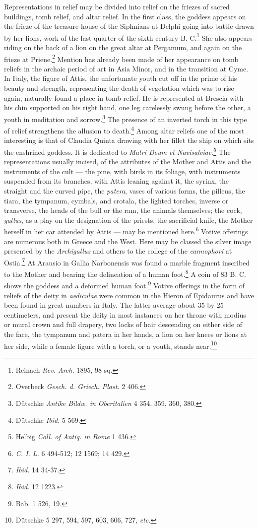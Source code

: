 \documentclass[a4paper, 11pt, oneside, polutonikogreek, english]{article}
\begin{document}
Representations in relief may be divided into relief on the friezes of sacred buildings, tomb relief, and altar relief. In the first class, the goddess appears on the frieze of the treasure-house of the Siphnians at Delphi going into battle drawn by her lions, work of the last quarter of the sixth century B. C.\footnote{Reinach \emph{Rev. Arch.} 1895, 98 sq.} She also appears riding on the back of a lion on the great altar at Pergamum, and again on the frieze at Priene.\footnote{Overbeck \emph{Gesch. d. Griech. Plast.} 2 406.} Mention has already been made of her appearance on tomb reliefs in the archaic period of art in Asia Minor, and in the transition at Cyme. In Italy, the figure of Attis, the unfortunate youth cut off in the prime of his beauty and strength, representing the death of vegetation which was to rise again, naturally found a place in tomb relief. He is represented at Brescia with his chin supported on his right hand, one leg carelessly swung before the other, a youth in meditation and sorrow.\footnote{Dütschke \emph{Antike Bildw. in Oberitalien} 4 354, 359, 360, 380.} The presence of an inverted torch in this type of relief strengthens the allusion to death.\footnote{Dütschke \emph{Ibid.} 5 569.} Among altar reliefs one of the most interesting is that of Claudia Quinta drawing with her fillet the ship on which sits the enshrined goddess. It is dedicated to \emph{Matri Deum et Navisalviae}.\footnote{Helbig \emph{Coll. of Antiq. in Rome} 1 436.} The representations usually incised, of the attributes of the Mother and Attis and the instruments of the cult --- the pine, with birds in its foliage, with instruments suspended from its branches, with Attis leaning against it, the syrinx, the straight and the curved pipe, the \emph{patera}, vases of various forms, the pilleus, the tiara, the tympanum, cymbals, and crotala, the lighted torches, inverse or transverse, the heads of the bull or the ram, the animals themselves; the cock, \emph{gallus}, as a play on the designation of the priests, the sacrificial knife, the Mother herself in her car attended by Attis --- may be mentioned here.\footnote{\emph{C. I. L.} 6 494-512; 12 1569; 14 429.} Votive offerings are numerous both in Greece and the West. Here may be classed the silver image presented by the \emph{Archigallus} and others to the college of the \emph{cannophori} at Ostia.\footnote{\emph{Ibid.} 14 34-37.} At Arausio in Gallia Narbonensis was found a marble fragment inscribed to the Mother and bearing the delineation of a human foot.\footnote{\emph{Ibid.} 12 1223.} A coin of 83 B. C. shows the goddess and a deformed human foot.\footnote{Bab. 1 526, 19.} Votive offerings in the form of reliefs of the deity in \emph{aediculae} were common in the Hieron of Epidaurus and have been found in great numbers in Italy. The latter average about 35 by 25 centimeters, and present the deity in most instances on her throne with modius or mural crown and full drapery, two locks of hair descending on either side of the face, the tympanum and patera in her hands, a lion on her knees or lions at her side, while a female figure with a torch, or a youth, stands near.\footnote{Dütschke 5 297, 594, 597, 603, 606, 727, \emph{etc.}}
\end{document}

